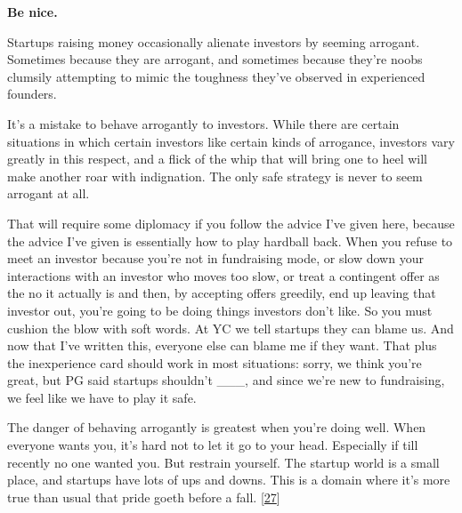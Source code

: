                     \textbf{Be nice.}

Startups raising money
                    occasionally alienate investors by seeming arrogant.
                    Sometimes because they are arrogant, and sometimes because
                    they're noobs clumsily attempting to mimic the toughness
                    they've observed in experienced founders.

It's a
                    mistake to behave arrogantly to investors. While there are
                    certain situations in which certain investors like certain
                    kinds of arrogance, investors vary greatly in this respect,
                    and a flick of the whip that will bring one to heel will
                    make another roar with indignation. The only safe strategy
                    is never to seem arrogant at all.

That will
                    require some diplomacy if you follow the advice I've given
                    here, because the advice I've given is essentially how to
                    play hardball back. When you refuse to meet an investor
                    because you're not in fundraising mode, or slow down your
                    interactions with an investor who moves too slow, or treat a
                    contingent offer as the no it actually is and then, by
                    accepting offers greedily, end up leaving that investor out,
                    you're going to be doing things investors don't like. So you
                    must cushion the blow with soft words. At YC we tell
                    startups they can blame us. And now that I've written this,
                    everyone else can blame me if they want. That plus the
                    inexperience card should work in most situations: sorry, we
                    think you're great, but PG said startups shouldn't \_\_\_, and
                    since we're new to fundraising, we feel like we have to play
                    it safe.

The danger of behaving arrogantly is
                    greatest when you're doing well. When everyone wants you,
                    it's hard not to let it go to your head. Especially if till
                    recently no one wanted you. But restrain yourself. The
                    startup world is a small place, and startups have lots of
                    ups and downs. This is a domain where it's more true than
                    usual that pride goeth before a fall.
                    [\href{\#f27n}{27}]

